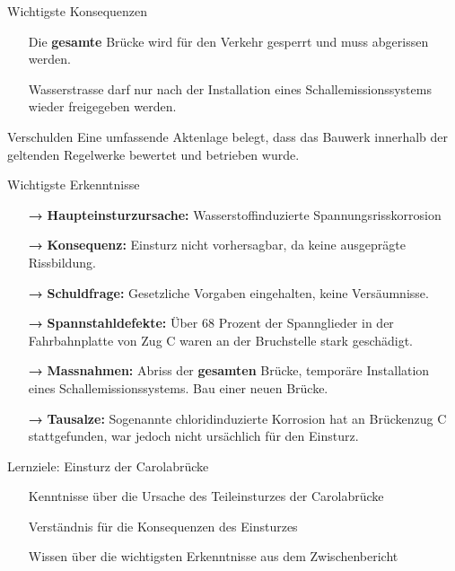 \begin{frame}{Wichtigste Konsequenzen}
    \begin{block}{}
        \begin{itemize}
            \item[\textbullet] Die \textbf{gesamte }Brücke wird für den Verkehr gesperrt und muss abgerissen werden.
            \item[\textbullet] Wasserstrasse darf nur nach der Installation eines Schallemissionssystems wieder freigegeben werden.
        \end{itemize}
    \end{block}
    \pause
    \begin{block}{Verschulden}
        Eine umfassende Aktenlage belegt, dass
        das Bauwerk innerhalb der geltenden Regelwerke bewertet und betrieben wurde.
    \end{block}
\end{frame}


\begin{frame}{Wichtigste Erkenntnisse}
    \begin{itemize}
        \item [\textbf{→}] \textbf{Haupteinsturzursache:} Wasserstoffinduzierte Spannungsrisskorrosion
        \item [\textbf{→}] \textbf{Konsequenz:} Einsturz nicht vorhersagbar, da keine ausgeprägte Rissbildung.
        \item [\textbf{→}] \textbf{Schuldfrage:} Gesetzliche Vorgaben eingehalten, keine Versäumnisse.
        \item [\textbf{→}] \textbf{Spannstahldefekte:} Über 68 Prozent der Spannglieder in der Fahrbahnplatte von Zug C waren an der Bruchstelle stark geschädigt.
        \item [\textbf{→}] \textbf{Massnahmen:} Abriss der \textbf{gesamten} Brücke, temporäre Installation eines Schallemissionssystems. Bau einer neuen Brücke.
        \item [\textbf{→}] \textbf{Tausalze:} Sogenannte chloridinduzierte Korrosion hat an Brückenzug C stattgefunden, war jedoch nicht ursächlich für den Einsturz.
    \end{itemize}
\end{frame}

\begin{frame}{Lernziele: Einsturz der Carolabrücke}
    \begin{myLernziele}
        \begin{itemize}
            \item[\textbullet] Kenntnisse über die Ursache des Teileinsturzes der Carolabrücke
            \item[\textbullet] Verständnis für die Konsequenzen des Einsturzes
            \item[\textbullet] Wissen über die wichtigsten Erkenntnisse aus dem Zwischenbericht
        \end{itemize}
    \end{myLernziele}
\end{frame}


